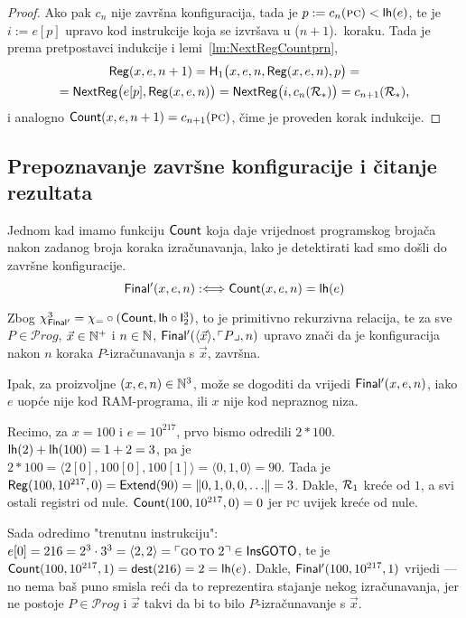 \begin{proof}
Ako pak $c_n$ nije završna konfiguracija, tada je $p:=c_n(\textsc{pc})<\mathsf{lh}(e)$, te je $i:=e[p]$ upravo kod instrukcije koja se izvršava u ($n+1$).\ koraku. Tada je prema pretpostavci indukcije i lemi~\ref{lm:NextRegCountprn},
\begin{multline}
    \mathsf{Reg}(x,e,n+1)=\mathsf H_1\bigl(x,e,n,\mathsf{Reg}(x,e,n),p\bigr)=\\
    =\mathsf{NextReg}\bigl(e[p],\mathsf{Reg}(x,e,n)\bigr)=\mathsf{NextReg}\bigl(i,c_n(\mathcal R_{*})\bigr)=c_{n+1}(\mathcal R_{*})\text,
\end{multline}
i analogno $\mathsf{Count}(x,e,n+1)=c_{n+1}(\textsc{pc})$, čime je proveden korak indukcije.
\end{proof}

\subsection{Prepoznavanje završne konfiguracije i čitanje rezultata}

Jednom kad imamo funkciju $\mathsf{Count}$ koja daje vrijednost programskog brojača nakon zadanog broja koraka izračunavanja, lako je detektirati kad smo došli do završne konfiguracije.
\begin{equation}
    \mathsf{Final'}(x,e,n):\Longleftrightarrow\mathsf{Count}(x,e,n)=\mathsf{lh}(e)
\end{equation}

Zbog $\chi_{\mathsf{Final'}}^3=\chi_=\circ(\mathsf{Count},\mathsf{lh}\circ\mathsf I_2^3)$, to je primitivno rekurzivna relacija, te za sve $P\in\mathcal Prog$, $\vec x\in{\mathbb N}^+$ i $n\in{\mathbb N}$, $\mathsf{Final'}(\langle\vec x\rangle,\ulcorner P\lrcorner,n)$ upravo znači da je konfiguracija nakon $n$ koraka $P$-izračunavanja s $\vec x$, završna.

Ipak, za proizvoljne $(x,e,n)\in{\mathbb N}^3$, može se dogoditi da vrijedi $\mathsf{Final'}(x,e,n)$, iako $e$ uopće nije kod RAM-programa, ili $x$ nije kod nepraznog niza.

\begin{primjer}\label{pr:Final'}
Recimo, za $x=100$ i $e=10^{217}$, prvo bismo odredili
$2*100$. $\mathsf{lh}(2)+\mathsf{lh}(100)=1+2=3$, pa je $2*100=\langle 2[0],100[0],100[1]\rangle=\langle0,1,0\rangle=90$. Tada je
$\mathsf{Reg}(100,10^{217},0)=\mathsf{Extend}(90)=\lVert0,1,0,0,\dotsc\rVert=3$. Dakle, $\mathcal R_{1}$ kreće od $1$, a svi ostali registri od nule.  $\mathsf{Count}(100,10^{217},0)=0$ jer \textsc{pc} uvijek kreće od nule.

Sada odredimo "trenutnu instrukciju": $e[0]=216=2^3\cdot3^3=\langle2,2\rangle=\ulcorner\textsc{go\,to}\;2\urcorner\in\mathsf{InsGOTO}$, te je $\mathsf{Count}(100,10^{217},1)=\mathsf{dest}(216)=2=\mathsf{lh}(e)$. Dakle, $\mathsf{Final'}(100,10^{217},1)$ vrijedi --- no nema baš puno smisla reći da to reprezentira stajanje nekog izračunavanja, jer ne postoje $P\in\mathcal Prog$ i $\vec x$ takvi da bi to bilo $P$-izračunavanje s $\vec x$.
\end{primjer}


